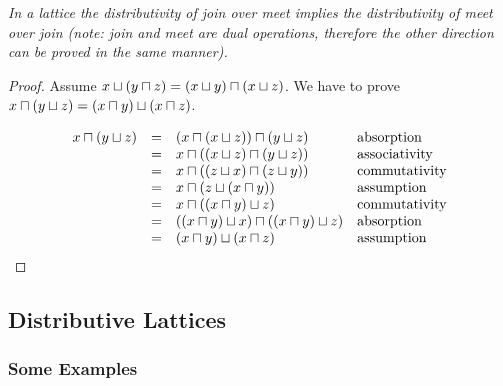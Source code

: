\begin{theorem}
    \label{thmOneDistributivitySufficient}
    \emph{In a lattice the distributivity of join over meet implies the
    distributivity of meet over join (note: join and meet are dual operations,
    therefore the other direction can be proved in the same manner).
    }

    \begin{proof}
        Assume $x \sqcup (y \sqcap z) = (x \sqcup y) \sqcap (x \sqcup z)$. We have to
        prove $x \sqcap (y \sqcup z) = (x \sqcap y) \sqcup (x \sqcap z)$.

        $$
        \begin{array}{lllll} 
            x \sqcap (y \sqcup z)
            &=&
            (x \sqcap (x \sqcup z)) \sqcap (y \sqcup z)
            & \text{absorption}
            \\
            &=&
            x \sqcap ((x \sqcup z) \sqcap (y \sqcup z))
            & \text{associativity}
            \\
            &=&
            x \sqcap ((z \sqcup x) \sqcap (z \sqcup y))
            & \text{commutativity}
            \\
            &=&
            x \sqcap (z \sqcup (x \sqcap y))
            & \text{assumption}
            \\
            &=&
            x \sqcap ((x \sqcap y) \sqcup z)
            & \text{commutativity}
            \\
            &=&
            ((x \sqcap y) \sqcup x) \sqcap ((x \sqcap y) \sqcup z)
            & \text{absorption}
            \\
            &=&
            (x \sqcap y) \sqcup (x \sqcap z)
            &\text{assumption}
         \end{array}
        $$
    \end{proof}
\end{theorem}



\subsection{Distributive Lattices}



\subsubsection{Some Examples}

